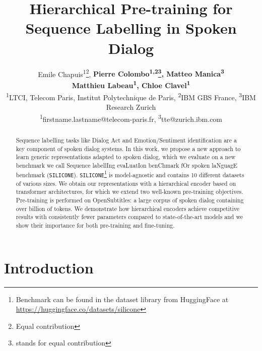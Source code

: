 \documentclass[11pt,a4paper]{article}
\title{Hierarchical Pre-training for Sequence Labelling in Spoken Dialog}
\author{Emile Chapuis\textsuperscript{\rm 1}\footnote[1]{Equal contribution}, \textbf{Pierre Colombo\textsuperscript{\rm 1,2}\thanks{\rm stands for equal contribution}, Matteo Manica\textsuperscript{\rm 3}}\\ \textbf{Matthieu Labeau\textsuperscript{\rm 1}, Chloe Clavel\textsuperscript{\rm 1}}\\
\textsuperscript{\rm 1}LTCI, Telecom Paris, Institut Polytechnique de Paris, \textsuperscript{\rm 2}IBM GBS France, \textsuperscript{\rm 3}IBM Research Zurich\\
\textsuperscript{\rm 1}firstname.lastname@telecom-paris.fr, \textsuperscript{\rm 3}tte@zurich.ibm.com 
}
\date{}
\begin{document}
\maketitle
\begin{abstract}
Sequence labelling tasks like Dialog Act and Emotion/Sentiment identification are a key component of spoken dialog systems. In this work, we propose a new approach to learn generic representations adapted to spoken dialog, which we evaluate on a new benchmark we call Sequence labellIng evaLuatIon benChmark fOr spoken laNguagE benchmark (\texttt{SILICONE}). \texttt{SILICONE}\footnote{Benchmark can be found in the dataset library from HuggingFace \cite{2020HuggingFace-datasets} at \url{https://huggingface.co/datasets/silicone}} is model-agnostic and contains 10 different datasets of various sizes. We obtain our representations with a hierarchical encoder based on transformer architectures, for which we extend two well-known pre-training objectives. Pre-training is performed on OpenSubtitles: a large corpus of spoken dialog containing over  billion of tokens.
We demonstrate how hierarchical encoders achieve competitive results with consistently fewer parameters compared to state-of-the-art models and we show their importance for both pre-training and fine-tuning.
\end{abstract}

\section{Introduction}
\end{document}
